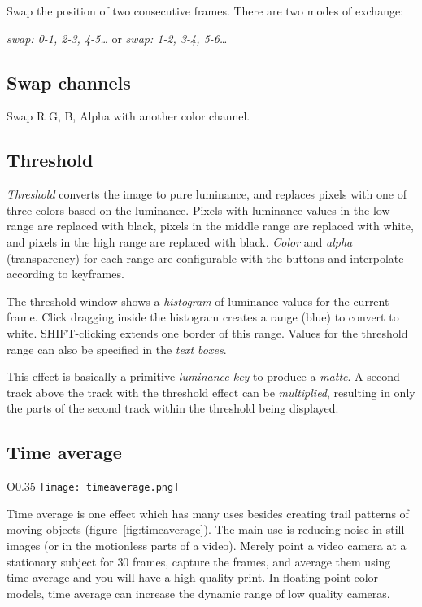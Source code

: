Swap the position of two consecutive frames. There are two modes of exchange:

\qquad \textit{swap: 0-1, 2-3, 4-5\dots} \qquad or \qquad \textit{swap: 1-2, 3-4, 5-6\dots}

\subsection{Swap channels}%
\label{sub:swap_channels}

Swap R G, B, Alpha with another color channel.

\subsection{Threshold}%
\label{sub:threshold}

\textit{Threshold} converts the image to pure luminance, and replaces pixels with one of three colors based on the luminance. Pixels with luminance values in the low range are replaced with black, pixels in the middle range are replaced with white, and pixels in the high range are replaced with black. \textit{Color} and \textit{alpha} (transparency) for each range are configurable with the buttons and interpolate according to keyframes.

The threshold window shows a \textit{histogram} of luminance values for the current frame. Click dragging inside the histogram creates a range (blue) to convert to white. SHIFT-clicking extends one border of this range. Values for the threshold range can also be specified in the \textit{text boxes}.

This effect is basically a primitive \textit{luminance key} to produce a \textit{matte}. A second track above the track with the threshold effect can be \textit{multiplied}, resulting in only the parts of the second track within the threshold being displayed.

\subsection{Time average}%
\label{sub:time_average}

\begin{wrapfigure}[18]{O}{0.35\linewidth}
	\vspace{-2ex}
	\texttt{[image: timeaverage.png]}
	\caption{GUI for Time Average}
	\label{fig:timeaverage}
\end{wrapfigure}

Time average is one effect which has many uses besides creating trail patterns of moving objects (figure~\ref{fig:timeaverage}).
The main use is reducing noise in still images (or in the motionless parts of a video). Merely point a video camera at a stationary subject for $30$ frames, capture the frames, and average them using time average and you will have a high quality print. In floating point color models, time average can increase the dynamic range of low quality cameras.

